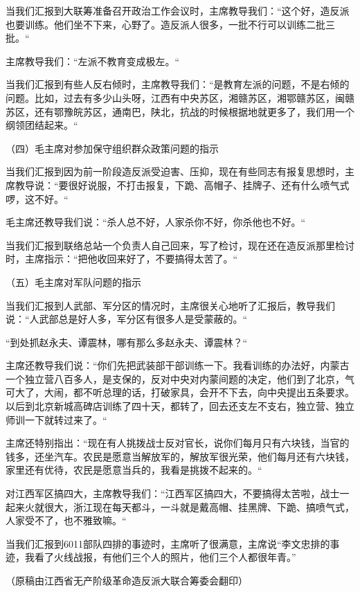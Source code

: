 当我们汇报到大联筹准备召开政治工作会议时，主席教导我们：“这个好，造反派也要训练。他们坐不下来，心野了。造反派人很多，一批不行可以训练二批三批。“

主席教导我们：“左派不教育变成极左。“

当我们汇报到有些人反右倾时，主席教导我们：“是教育左派的问题，不是右倾的问题。比如，过去有多少山头呀，江西有中央苏区，湘赣苏区，湘鄂赣苏区，闽赣苏区，还有鄂豫皖苏区，通南巴，陕北，抗战的时候根据地就更多了，我们用一个纲领团结起来。“

（四）毛主席对参加保守组织群众政策问题的指示

当我们汇报到因为前一阶段造反派受迫害、压抑，现在有些同志有报复思想时，主席教导说：“要很好说服，不打击报复，下跪、高帽子、挂牌子、还有什么喷气式啰，这不好。“

毛主席还教导我们说：“杀人总不好，人家杀你不好，你杀他也不好。“

当我们汇报到联络总站一个负责人自己回来，写了检讨，现在还在造反派那里检讨时，主席指示：“把他收回来好了，不要搞得太苦了。“

（五）毛主席对军队问题的指示

当我们汇报到人武部、军分区的情况时，主席很关心地听了汇报后，教导我们说：“人武部总是好人多，军分区有很多人是受蒙蔽的。“

“到处抓赵永夫、谭震林，哪有那么多赵永夫、谭震林？“

主席还教导我们说：“你们先把武装部干部训练一下。我看训练的办法好，内蒙古一个独立营八百多人，是支保的，反对中央对内蒙间题的决定，他们到了北京，气可大了，大闹，都不听总理的话，打破家具，会开不下去，向中央提出五条要求。以后到北京新城高碑店训练了四十天，都转了，回去还支左不支右，独立营、独立师训一下就转过来了。“

主席还特别指出：“现在有人挑拨战士反对官长，说你们每月只有六块钱，当官的钱多，还坐汽车。农民是愿意当解放军的，解放军很光荣，他们每月还有六块钱，家里还有优待，农民是愿意当兵的，我看是挑拨不起来的。“

对江西军区搞四大，主席教导我们：“江西军区搞四大，不要搞得太苦啦，战士一起来火就很大，浙江现在每天都斗，一斗就是戴高帽、挂黑牌、下跪、搞喷气式，人家受不了，也不雅致嘛。“

   当我们汇报到6011部队四排的事迹时，主席听了很满意，主席说“李文忠排的事迹，我看了火线战报，有他们三个人的照片，他们三个人都很年青。”

{\raggedleft          （原稿由江西省无产阶级革命造反派大联合筹委会翻印）\par}


